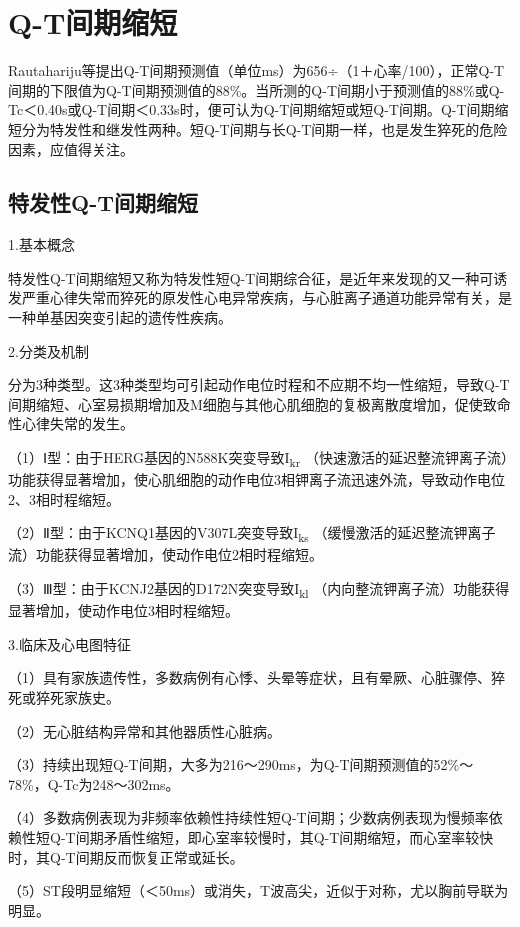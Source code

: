 \section{Q-T间期缩短}

Rautahariju等提出Q-T间期预测值（单位ms）为656÷（1＋心率/100），正常Q-T间期的下限值为Q-T间期预测值的88\%。当所测的Q-T间期小于预测值的88\%或Q-Tc＜0.40s或Q-T间期＜0.33s时，便可认为Q-T间期缩短或短Q-T间期。Q-T间期缩短分为特发性和继发性两种。短Q-T间期与长Q-T间期一样，也是发生猝死的危险因素，应值得关注。

\protect\hypertarget{text00013.htmlux5cux23subid105}{}{}

\subsection{特发性Q-T间期缩短}

1.基本概念

特发性Q-T间期缩短又称为特发性短Q-T间期综合征，是近年来发现的又一种可诱发严重心律失常而猝死的原发性心电异常疾病，与心脏离子通道功能异常有关，是一种单基因突变引起的遗传性疾病。

2.分类及机制

分为3种类型。这3种类型均可引起动作电位时程和不应期不均一性缩短，导致Q-T间期缩短、心室易损期增加及M细胞与其他心肌细胞的复极离散度增加，促使致命性心律失常的发生。

（1）Ⅰ型：由于HERG基因的N588K突变导致I\textsubscript{kr}
（快速激活的延迟整流钾离子流）功能获得显著增加，使心肌细胞的动作电位3相钾离子流迅速外流，导致动作电位2、3相时程缩短。

（2）Ⅱ型：由于KCNQ1基因的V307L突变导致I\textsubscript{ks}
（缓慢激活的延迟整流钾离子流）功能获得显著增加，使动作电位2相时程缩短。

（3）Ⅲ型：由于KCNJ2基因的D172N突变导致I\textsubscript{kl}
（内向整流钾离子流）功能获得显著增加，使动作电位3相时程缩短。

3.临床及心电图特征

（1）具有家族遗传性，多数病例有心悸、头晕等症状，且有晕厥、心脏骤停、猝死或猝死家族史。

（2）无心脏结构异常和其他器质性心脏病。

（3）持续出现短Q-T间期，大多为216～290ms，为Q-T间期预测值的52\%～78\%，Q-Tc为248～302ms。

（4）多数病例表现为非频率依赖性持续性短Q-T间期；少数病例表现为慢频率依赖性短Q-T间期矛盾性缩短，即心室率较慢时，其Q-T间期缩短，而心室率较快时，其Q-T间期反而恢复正常或延长。

（5）ST段明显缩短（＜50ms）或消失，T波高尖，近似于对称，尤以胸前导联为明显。

